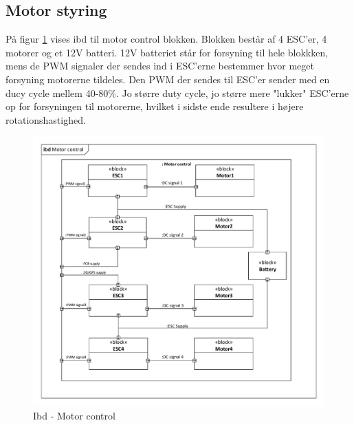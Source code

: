 \subsection{Motor styring}

På figur \ref{fig:ibd_motorcontrol} vises ibd til motor control blokken. Blokken består af 4 ESC'er, 4 motorer og et 12V batteri. 12V batteriet står for forsyning til hele blokkken, mens de PWM signaler der sendes ind i ESC'erne bestemmer hvor meget forsyning motorerne tildeles. Den PWM der sendes til ESC'er sender med en ducy cycle mellem 40-80\%. Jo større duty cycle, jo større mere "lukker" ESC'erne op for forsyningen til motorerne, hvilket i sidste ende resultere i højere rotationshastighed.  

\begin{figure}[H]
\centering
\includegraphics[width=1\textwidth]{Billeder/IBD/ibd6_motorcontrol.pdf}
\vspace{-1cm}
\caption{Ibd - Motor control}
\label{fig:ibd_motorcontrol}
\end{figure}

